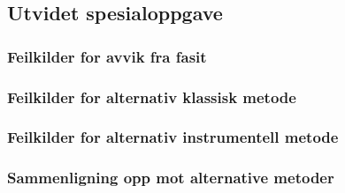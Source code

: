 

\subsection{Utvidet spesialoppgave}

\subsubsection{Feilkilder for avvik fra fasit}


\subsubsection{Feilkilder for alternativ klassisk metode}


\subsubsection{Feilkilder for alternativ instrumentell metode}


\subsubsection{Sammenligning opp mot alternative metoder}

